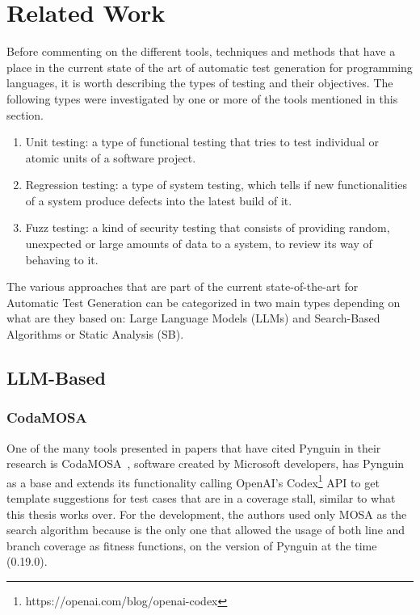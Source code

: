\documentclass[%
  chapterprefix=false,%
  open=right,%
  twoside=true,%
  paper=a4,%
  logofile={Figures/logo.png},%
  thesistype=master,%
  UKenglish,%
]{se2thesis}
\begin{document}
\chapter{Related Work}\label{chap:related_work}


Before commenting on the different tools, techniques and methods that have a place in the current state of the art of automatic test generation for programming languages, it is worth describing the types of testing and their objectives. The following types were investigated by one or more of the tools mentioned in this section. 

\begin{enumerate}
  \item Unit testing: a type of functional testing that tries to test individual or atomic units of a software project.
  \item Regression testing: a type of system testing, which tells if new functionalities of a system produce defects into the latest build of it.
  \item Fuzz testing: a kind of security testing that consists of providing random, unexpected or large amounts of data to a system, to review its way of behaving to it.
\end{enumerate}

The various approaches that are part of the current state-of-the-art for Automatic Test Generation can be categorized in two main types depending on what are they based on: Large Language Models (LLMs) and Search-Based Algorithms or Static Analysis (SB).

\section{LLM-Based}

\subsection{CodaMOSA}

One of the many tools presented in papers that have cited Pynguin in their research is CodaMOSA~\cite{DBLP:conf/icse/LemieuxILS23}, software created by Microsoft developers, has Pynguin as a base and extends its functionality calling OpenAI's Codex\footnote{https://openai.com/blog/openai-codex} API to get template suggestions for test cases that are in a coverage stall, similar to what this thesis works over.
For the development, the authors used only MOSA as the search algorithm because is the only one that allowed the usage of both line and branch coverage as fitness functions, on the version of Pynguin at the time (0.19.0).
\end{document}
